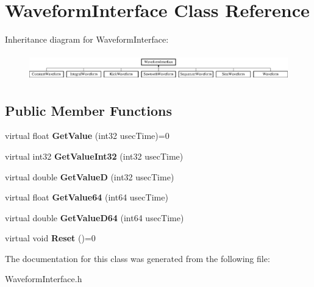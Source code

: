 \hypertarget{classWaveformInterface}{
\section{WaveformInterface Class Reference}
\label{classWaveformInterface}
}
Inheritance diagram for WaveformInterface:\begin{figure}[H]
\begin{center}
\leavevmode
\includegraphics[height=1.159420cm]{classWaveformInterface}
\end{center}
\end{figure}
\subsection*{Public Member Functions}
\begin{DoxyCompactItemize}
\item 
\hypertarget{classWaveformInterface_aef679b3365b542ed5268b46d01f7f5a7}{
virtual float {\bfseries GetValue} (int32 usecTime)=0}
\label{classWaveformInterface_aef679b3365b542ed5268b46d01f7f5a7}

\item 
\hypertarget{classWaveformInterface_a466705327288a237be0f8623d9890291}{
virtual int32 {\bfseries GetValueInt32} (int32 usecTime)}
\label{classWaveformInterface_a466705327288a237be0f8623d9890291}

\item 
\hypertarget{classWaveformInterface_a25947afe4c1ada2e10a21dfaa7d8e8b5}{
virtual double {\bfseries GetValueD} (int32 usecTime)}
\label{classWaveformInterface_a25947afe4c1ada2e10a21dfaa7d8e8b5}

\item 
\hypertarget{classWaveformInterface_a7c78e14343080ee82cb6bdfe42d3f2b5}{
virtual float {\bfseries GetValue64} (int64 usecTime)}
\label{classWaveformInterface_a7c78e14343080ee82cb6bdfe42d3f2b5}

\item 
\hypertarget{classWaveformInterface_a54abdef10a194f21fbbfd9202d0a58df}{
virtual double {\bfseries GetValueD64} (int64 usecTime)}
\label{classWaveformInterface_a54abdef10a194f21fbbfd9202d0a58df}

\item 
\hypertarget{classWaveformInterface_a215fc20e03cdb25f95ebd461d7e30e87}{
virtual void {\bfseries Reset} ()=0}
\label{classWaveformInterface_a215fc20e03cdb25f95ebd461d7e30e87}

\end{DoxyCompactItemize}


The documentation for this class was generated from the following file:\begin{DoxyCompactItemize}
\item 
WaveformInterface.h\end{DoxyCompactItemize}
